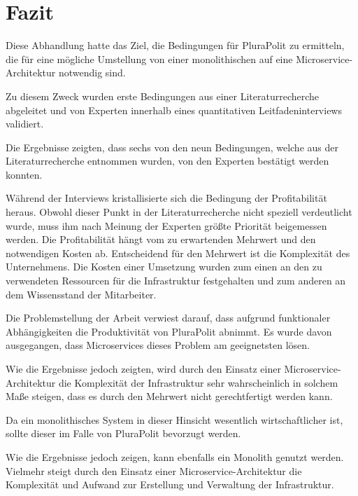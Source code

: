 \section{Fazit}

Diese Abhandlung hatte das Ziel, die Bedingungen für PluraPolit zu ermitteln, die für eine mögliche Umstellung von einer monolithischen auf eine Microservice-Architektur notwendig sind.
 
 Zu diesem Zweck wurden erste Bedingungen aus einer Literaturrecherche abgeleitet und von Experten innerhalb eines quantitativen Leitfadeninterviews validiert.

Die Ergebnisse zeigten, dass sechs von den neun Bedingungen, 
welche aus der Literaturrecherche entnommen wurden, von den Experten bestätigt werden konnten.

Während der Interviews kristallisierte sich die Bedingung der Profitabilität heraus. Obwohl dieser Punkt in der Literaturrecherche nicht speziell verdeutlicht wurde, muss ihm nach Meinung der Experten größte Priorität beigemessen werden. Die Profitabilität hängt vom zu erwartenden Mehrwert und den notwendigen Kosten ab. Entscheidend für den Mehrwert ist die Komplexität des Unternehmens. Die Kosten einer Umsetzung wurden zum einen an den zu verwendeten Ressourcen für die Infrastruktur festgehalten und zum anderen an dem Wissensstand der Mitarbeiter.

Die Problemstellung der Arbeit verwiest darauf, dass aufgrund funktionaler Abhängigkeiten die Produktivität von PluraPolit abnimmt. Es wurde davon ausgegangen, dass Microservices dieses Problem am geeignetsten lösen.

Wie die Ergebnisse jedoch zeigten, wird durch den Einsatz einer Microservice-Architektur die Komplexität der Infrastruktur sehr wahrscheinlich in solchem Maße steigen, dass es durch den Mehrwert nicht gerechtfertigt werden kann.

Da ein monolithisches System in dieser Hinsicht wesentlich wirtschaftlicher ist, sollte dieser im Falle von PluraPolit bevorzugt werden.
 
Wie die Ergebnisse jedoch zeigen, kann ebenfalls ein Monolith genutzt werden. Vielmehr steigt durch den Einsatz einer Microservice-Architektur die Komplexität und Aufwand zur Erstellung und Verwaltung der Infrastruktur.

